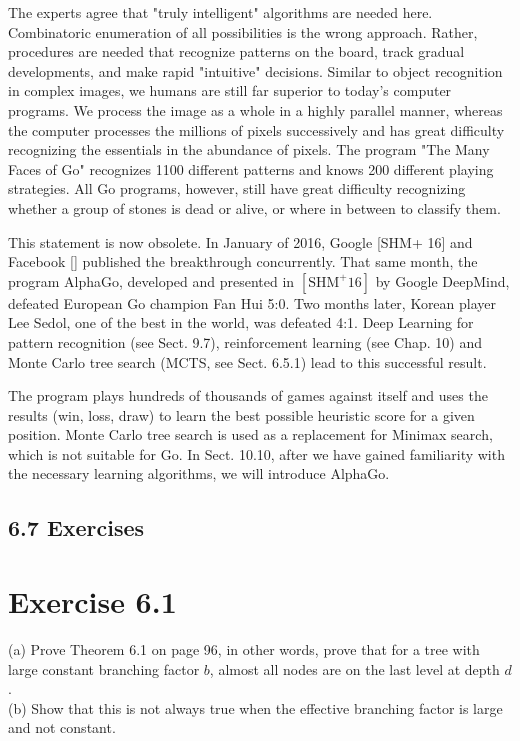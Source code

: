 \documentclass[10pt]{article}
\begin{document}
\begin{displayquote}
The experts agree that "truly intelligent" algorithms are needed here. Combinatoric enumeration of all possibilities is the wrong approach. Rather, procedures are needed that recognize patterns on the board, track gradual developments, and make rapid "intuitive" decisions. Similar to object recognition in complex images, we humans are still far superior to today's computer programs. We process the image as a whole in a highly parallel manner, whereas the computer processes the millions of pixels successively and has great difficulty recognizing the essentials in the abundance of pixels. The program "The Many Faces of Go" recognizes 1100 different patterns and knows 200 different playing strategies. All Go programs, however, still have great difficulty recognizing whether a group of stones is dead or alive, or where in between to classify them.
\end{displayquote}

This statement is now obsolete. In January of 2016, Google [SHM+ 16] and Facebook [\cite{tian2016better}] published the breakthrough concurrently. That same month, the program AlphaGo, developed and presented in $\left[\mathrm{SHM}^{+} 16\right]$ by Google DeepMind, defeated European Go champion Fan Hui 5:0. Two months later, Korean player Lee Sedol, one of the best in the world, was defeated 4:1. Deep Learning for pattern recognition (see Sect. 9.7), reinforcement learning (see Chap. 10) and Monte Carlo tree search (MCTS, see Sect. 6.5.1) lead to this successful result.


The program plays hundreds of thousands of games against itself and uses the results (win, loss, draw) to learn the best possible heuristic score for a given position. Monte Carlo tree search is used as a replacement for Minimax search, which is not suitable for Go. In Sect. 10.10, after we have gained familiarity with the necessary learning algorithms, we will introduce AlphaGo.

\subsection*{6.7 Exercises}
\section*{Exercise 6.1}
(a) Prove Theorem 6.1 on page 96, in other words, prove that for a tree with large constant branching factor $b$, almost all nodes are on the last level at depth $d$.\\
(b) Show that this is not always true when the effective branching factor is large and not constant.
\end{document}
